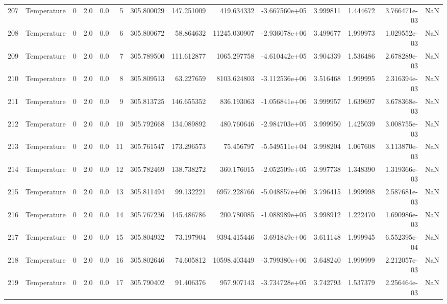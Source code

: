 \begin{tabular}{llrrrrrrrrrrrr}
207 &  Temperature &       0 &  2.0 &  0.0 &    5 &  305.800029 &   147.251009 &     419.634332 & -3.667560e+05 &  3.999811 &  1.444672 &  3.766471e-03 &      NaN \\
208 &  Temperature &       0 &  2.0 &  0.0 &    6 &  305.800672 &    58.864632 &   11245.030907 & -2.936078e+06 &  3.499677 &  1.999973 &  1.029552e-03 &      NaN \\
209 &  Temperature &       0 &  2.0 &  0.0 &    7 &  305.789500 &   111.612877 &    1065.297758 & -4.610442e+05 &  3.904339 &  1.536486 &  2.678289e-03 &      NaN \\
210 &  Temperature &       0 &  2.0 &  0.0 &    8 &  305.809513 &    63.227659 &    8103.624803 & -3.112536e+06 &  3.516468 &  1.999995 &  2.316394e-03 &      NaN \\
211 &  Temperature &       0 &  2.0 &  0.0 &    9 &  305.813725 &   146.655352 &     836.193063 & -1.056841e+06 &  3.999957 &  1.639697 &  3.678368e-03 &      NaN \\
212 &  Temperature &       0 &  2.0 &  0.0 &   10 &  305.792668 &   134.089892 &     480.760646 & -2.984703e+05 &  3.999950 &  1.425039 &  3.008755e-03 &      NaN \\
213 &  Temperature &       0 &  2.0 &  0.0 &   11 &  305.761547 &   173.296573 &      75.456797 & -5.549511e+04 &  3.998204 &  1.067608 &  3.113870e-03 &      NaN \\
214 &  Temperature &       0 &  2.0 &  0.0 &   12 &  305.782469 &   138.738272 &     360.176015 & -2.052509e+05 &  3.997738 &  1.348390 &  1.319366e-03 &      NaN \\
215 &  Temperature &       0 &  2.0 &  0.0 &   13 &  305.811494 &    99.132221 &    6957.228766 & -5.048857e+06 &  3.796415 &  1.999998 &  2.587681e-03 &      NaN \\
216 &  Temperature &       0 &  2.0 &  0.0 &   14 &  305.767236 &   145.486786 &     200.780085 & -1.088989e+05 &  3.998912 &  1.222470 &  1.690986e-03 &      NaN \\
217 &  Temperature &       0 &  2.0 &  0.0 &   15 &  305.804932 &    73.197904 &    9394.415446 & -3.691849e+06 &  3.611148 &  1.999945 &  6.552395e-04 &      NaN \\
218 &  Temperature &       0 &  2.0 &  0.0 &   16 &  305.802646 &    74.605812 &   10598.403449 & -3.799380e+06 &  3.648240 &  1.999999 &  2.212057e-03 &      NaN \\
219 &  Temperature &       0 &  2.0 &  0.0 &   17 &  305.790402 &    91.406376 &     957.907143 & -3.734728e+05 &  3.742793 &  1.537379 &  2.256464e-03 &      NaN \\

\end{tabular}
